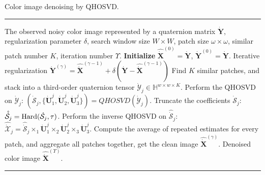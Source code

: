 \documentclass[journal]{IEEEtran}
\begin{document}
\begin{table}[htbp]
	\caption{Color image denoising by QHOSVD.}
	\hrule
	\label{tab_algorithm0}
	\begin{algorithmic}[1]
		\REQUIRE The observed noisy color image represented by a quaternion matrix $\dot{\mathbf{Y}}$, regularization parameter $\delta$, search window size $W\times W$, patch size $\omega\times \omega$, similar patch number $K$, iteration number $\varUpsilon$.
		\STATE \textbf{Initialize} $\hat{\dot{\mathbf{X}}}^{(0)}=\dot{\mathbf{Y}}$, $\dot{\mathbf{Y}}^{(0)}=\dot{\mathbf{Y}}$.
		\STATE Iterative regularization $\dot{\mathbf{Y}}^{(\gamma)}=\hat{\dot{\mathbf{X}}}^{(\gamma-1)}+\delta(\dot{\mathbf{Y}}-\hat{\dot{\mathbf{X}}}^{(\gamma-1)})$
		\STATE Find $K$ similar patches, and stack into a third-order quaternion tensor $\dot{\mathcal{Y}}_{j}\in\mathbb{H}^{w\times w \times K}$.
		\STATE  Perform the QHOSVD on $\dot{\mathcal{Y}}_{j}$: $(\dot{\mathcal{S}}_{j}, \{\dot{\mathbf{U}}_{1}^{j},\dot{\mathbf{U}}_{2}^{j},\dot{\mathbf{U}}_{3}^{j}\})=QHOSVD(\dot{\mathcal{Y}}_{j})$.
		\STATE Truncate the coefficients $\dot{\mathcal{S}}_{j}$: $\hat{\dot{\mathcal{S}}}_{j}={\rm{Hard}}(\dot{\mathcal{S}}_{j},\tau)$.
		\STATE Perform the inverse QHOSVD on $\hat{\dot{\mathcal{S}}}_{j}$: $\hat{\dot{\mathcal{X}}}_{j}=\hat{\dot{\mathcal{S}}}_{j}\times_{1}\dot{\mathbf{U}}_{1}^{j}\times_{2}\dot{\mathbf{U}}_{2}^{j}\times_{3}\dot{\mathbf{U}}_{3}^{j}$.
		\ENDFOR 
		\STATE Compute the average of repeated estimates for every patch, and aggregate all patches together, get the clean image $\hat{\dot{\mathbf{X}}}^{(\gamma)}$.
		\ENDFOR  
		\ENSURE  Denoised color image $\hat{\dot{\mathbf{X}}}^{(\varUpsilon)}$.
	\end{algorithmic}
	\hrule
\end{table}



\end{document}
